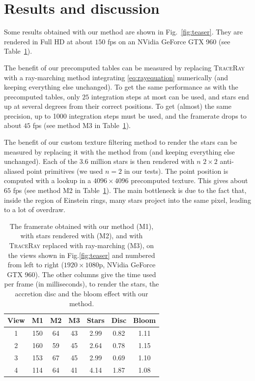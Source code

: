 \documentclass{document}
\begin{document}
\section{Results and discussion}\label{sec:results}

Some results obtained with our method are shown in Fig.~\ref{fig:teaser}. They 
are rendered in Full HD at about $150$ fps on an NVidia GeForce GTX 960 (see 
Table~\ref{table:perf}).

The benefit of our precomputed tables can be measured by replacing 
\textsc{TraceRay} with a ray-marching method integrating \eqref{eq:rayequation} 
numerically (and keeping everything else unchanged). To get the same 
performance as with the precomputed tables, only $25$ integration steps at most 
can be used, and stars end up at several degrees from their correct positions. 
To get (almost) the same precision, up to 1000 integration steps must be used, 
and the framerate drops to about $45$ fps (see method M3 in 
Table~\ref{table:perf}).

The benefit of our custom texture filtering method to render the stars can be 
measured by replacing it with the method from \cite{Muller2010} (and keeping 
everything else unchanged). Each of the $3.6$ million stars is then 
rendered with $n$ $2 \times 2$ anti-aliased point primitives (we used $n = 2$ 
in our tests). The point position is computed with a lookup in a $4096 \times 
4096$ precomputed texture. This gives about $65$ fps (see method M2 in 
Table~\ref{table:perf}). The main bottleneck is due to the fact that, inside 
the region of Einstein rings, many stars project into the same pixel, leading 
to a lot of overdraw.

\begin{table}
	\centering
	\begin{tabular}{|c|c|c|c|c|c|c|}
		\hline
		View & M1 & M2 & M3 & Stars & Disc & Bloom \\
		\hline
		\hline
		1 & 150 & 64 & 43 & 2.99 & 0.82 & 1.11 \\
		2 & 160 & 59 & 45 & 2.64 & 0.78 & 1.15 \\
		3 & 153 & 67 & 45 & 2.99 & 0.69 & 1.10 \\
		4 & 114 & 64 & 41 & 4.14 & 1.87 & 1.08 \\
		\hline
	\end{tabular}
	\caption{\label{table:perf} The framerate obtained with our method (M1), with 
	stars rendered with \cite{Muller2010} (M2), and with \textsc{TraceRay} 
	replaced with ray-marching (M3), on the views shown in Fig.\ref{fig:teaser} 
	and numbered from left to right ($1920\times1080$p, NVidia GeForce GTX 960). 
	The other columns give the time used per frame (in milliseconds), to render 
	the stars, the accretion disc and the bloom effect with our method.}
\end{table}
\end{document}
